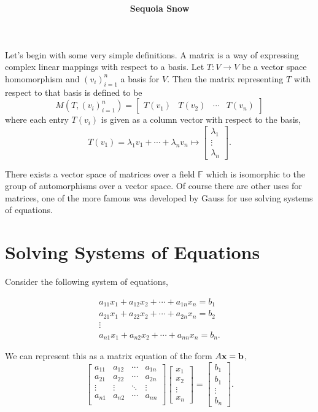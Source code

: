\documentclass[12pt]{extarticle}
\title{
\textmd{\textbf{\articletile}}\\
}
\author{\textbf{Sequoia Snow}}
\date{}
\renewcommand{\mapsto}[0]{\longmapsto}
\renewcommand{\to}[0]{\longrightarrow}
\newcommand{\F}{{\mathbb{F}}}
\newcommand{\m}[1]{\begin{bmatrix} #1 \end{bmatrix}}
\begin{document}
\maketitle

Let's begin with some very simple definitions. A matrix is a way of expressing complex linear mappings with respect to a basis. Let $T : V \to V$ be a vector space homomorphism and $(v_i)_{i = 1}^n$ a basis for $V$. Then the matrix representing $T$ with respect to that basis is defined to be 
\[
  M(T, (v_i)_{i=1}^n) = \m{ T(v_1) & T(v_2) & \cdots & T(v_n) }
\]
where each entry $T(v_i)$ is given as a column vector with respect to the basis, 
\[
  T(v_1) = \lambda_1 v_1 + \cdots + \lambda_n v_n \mapsto \m{ \lambda_1 \\ \vdots \\ \lambda_n}.
\]

There exists a vector space of matrices over a field $\F$ which is isomorphic to the group of automorphisms over a vector space. Of course there are other uses for matrices, one of the more famous was developed by Gauss for use solving systems of equations. 

\section*{Solving Systems of Equations}

Consider the following system of equations, 

\begin{gather*}
  a_{11} x_1 + a_{12} x_2 + \cdots + a_{1n}x_n = b_1 \\
  a_{21} x_1 + a_{22} x_2 + \cdots + a_{2n}x_n = b_2 \\
  \vdots \\
  a_{n1} x_1 + a_{n2} x_2 + \cdots + a_{nn}x_n = b_n .
\end{gather*}

We can represent this as a matrix equation of the form $A\vb{x} = \vb{b}$, 
\[
  \m{
    a_{11} & a_{12} & \cdots & a_{1n} \\
    a_{21} & a_{22} & \cdots & a_{2n} \\
    \vdots & \vdots & \ddots & \vdots \\
    a_{n1} & a_{n2} & \cdots & a_{nn} \\
  }
  \m{ x_1 \\ x_2 \\ \vdots \\ x_n } 
  = 
  \m{ b_1 \\ b_1 \\ \vdots \\ b_n }.
\] 
\end{document}
